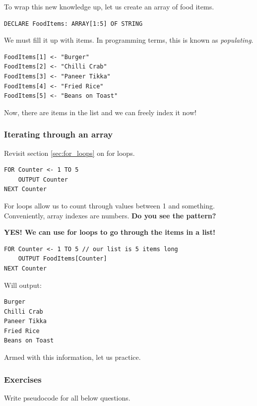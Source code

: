 \documentclass[./main.tex]{subfiles}
\begin{document}
To wrap this new knowledge up, let us create an array of food items.

\begin{verbatim}
DECLARE FoodItems: ARRAY[1:5] OF STRING
\end{verbatim}

We must fill it up with items. In programming terms, this is known as \emph{populating}.

\begin{verbatim}
FoodItems[1] <- "Burger"
FoodItems[2] <- "Chilli Crab"
FoodItems[3] <- "Paneer Tikka"
FoodItems[4] <- "Fried Rice"
FoodItems[5] <- "Beans on Toast"
\end{verbatim}

Now, there are items in the list and we can freely index it now!

\subsubsection{Iterating through an array}

Revisit section \ref{sec:for_loops} on for loops.

\begin{verbatim}
FOR Counter <- 1 TO 5
    OUTPUT Counter
NEXT Counter
\end{verbatim}

For loops allow us to count through values between 1 and something. Conveniently, array indexes are numbers. \textbf{Do you see the pattern?}

\textbf{YES! We can use for loops to go through the items in a list!}

\begin{verbatim}
FOR Counter <- 1 TO 5 // our list is 5 items long
    OUTPUT FoodItems[Counter]
NEXT Counter
\end{verbatim}

Will output:

\begin{verbatim}
Burger
Chilli Crab
Paneer Tikka
Fried Rice
Beans on Toast
\end{verbatim}

Armed with this information, let us practice.

\newpage
\subsubsection{Exercises}
\label{ex:3_2_3}

Write pseudocode for all below questions.
\end{document}
